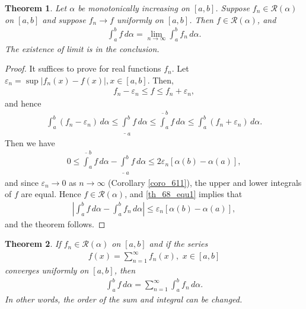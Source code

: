 \documentclass[11pt]{book}
\newtheorem{theorem}{Theorem}[chapter]
\theoremstyle{definition}
\numberwithin{equation}{chapter}
\begin{document}
\begin{theorem}\label{th_68}
Let $\alpha$ be monotonically increasing on $[a,b]$. Suppose $f_n \in \mathscr{R}(\alpha)$ on $[a,b]$ and suppose $f_n \to f$ uniformly on $[a,b]$. Then $f \in \mathscr{R}(\alpha)$, and
\begin{align*}
    \int^b_a f \,d\alpha = \lim_{n\to\infty} \int^b_a f_n \,d\alpha.
\end{align*}
The existence of limit is in the conclusion.
\end{theorem}
\begin{proof}
It suffices to prove for real functions $f_n$. Let $\varepsilon_n = \sup \left|f_n(x) - f(x)\right|, x \in [a,b]$. Then,
\begin{align*}
    f_n - \varepsilon_n \leq f \leq f_n + \varepsilon_n,
\end{align*}
and hence
\begin{align}\label{th_68_equ1}
    \int^b_a (f_n - \varepsilon_n) \,d\alpha \leq \underline{\int}^b_a f \,d\alpha \leq \overline{\int}^b_a f \,d\alpha \leq \int^b_a (f_n + \varepsilon_n) \,d\alpha.
\end{align}
Then we have
\begin{align*}
    0 \leq \overline{\int}^b_a f \,d\alpha - \underline{\int}^b_a f \,d\alpha \leq 2 \varepsilon_n [\alpha(b) - \alpha(a)],
\end{align*}
and since $\varepsilon_n \to 0$ as $n \to \infty$ (Corollary \ref{coro_611}), the upper and lower integrals of $f$ are equal. Hence $f \in \mathscr{R}(\alpha)$, and \eqref{th_68_equ1} implies
that 
\begin{align*}
    \left|\int^b_a f \,d\alpha - \int^b_a f_n \,d\alpha \right| \leq \varepsilon_n [\alpha(b) - \alpha(a)],
\end{align*}
and the theorem follows.
\end{proof}

\medskip

\begin{theorem}
If $f_n \in \mathscr{R}(\alpha)$ on $[a,b]$ and if the series
\begin{align*}
    f(x) = \sum^\infty_{n=1} f_n(x), \,\, x \in [a,b]
\end{align*}
converges uniformly on $[a,b]$, then
\begin{align*}
    \int^b_a f \,d\alpha = \sum^\infty_{n=1} \int^b_a f_n \,d\alpha.
\end{align*}
In other words, the order of the sum and integral can be changed.
\end{theorem}
\end{document}
